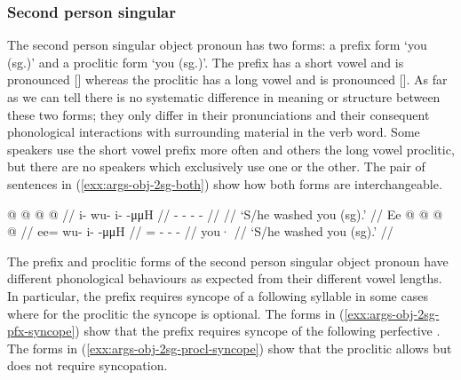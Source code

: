 
\subsubsection{Second person singular}\label{sec:args-obj-2sg}

The second person singular object pronoun has two forms: a prefix form  ‘you (sg.)’ and a proclitic form  ‘you (sg.)’. The prefix  has a short vowel and is pronounced [] whereas the proclitic  has a long vowel and is pronounced []. As far as we can tell there is no systematic difference in meaning or structure between these two forms; they only differ in their pronunciations and their consequent phonological interactions with surrounding material in the verb word. Some speakers use the short vowel prefix more often and others the long vowel proclitic, but there are no speakers which exclusively use one or the other. The pair of sentences in (\ref{exx:args-obj-2sg-both}) show how both forms are interchangeable.

\pex\label{exx:args-obj-2sg-both}%
\a\label{exx:args-obj-2sg-both-prefix}%
%
\begingl
	\gla	{} @ {} @ {} @ {} @ {} //
	\glb	i- wu- i-  -μμH //
	\glc	{}- - -  - //
	\gld	{} {} {} {} {} //
	\glft	‘S/he washed you (sg).’
		//
\endgl
\a\label{exx:args-obj-2sg-both-proclitic}%
%
\begingl
	\gla	Ee @  @ {} @ {} @ {} //
	\glb	ee= wu- i-  -μμH //
	\glc	{}= - -  - //
	\gld	you·  {} {} {} //
	\glft	‘S/he washed you (sg).’
		//
\endgl
\xe

The prefix and proclitic forms of the second person singular object pronoun have different phonological behaviours as expected from their different vowel lengths. In particular, the prefix requires syncope of a following syllable in some cases where for the proclitic the syncope is optional. The forms in (\ref{exx:args-obj-2sg-pfx-syncope}) show that the prefix  requires syncope of the following perfective . The forms in (\ref{exx:args-obj-2sg-procl-syncope}) show that the proclitic  allows but does not require syncopation.


